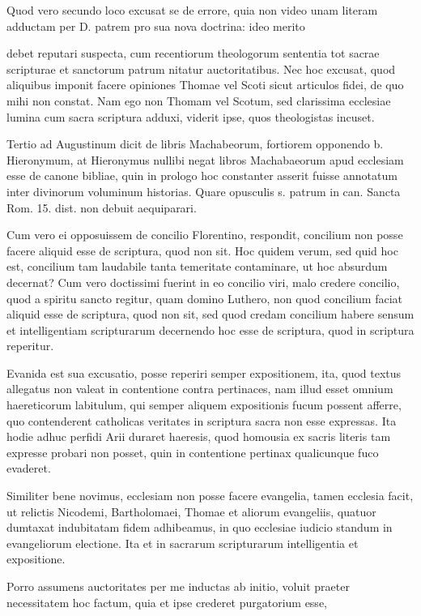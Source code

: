 Quod vero secundo loco excusat se de errore, quia non video unam literam adductam per D. patrem pro sua nova doctrina: ideo merito

debet reputari suspecta, cum recentiorum theologorum sententia tot sacrae scripturae et sanctorum patrum nitatur auctoritatibus. Nec hoc excusat, quod aliquibus imponit facere opiniones Thomae vel Scoti sicut articulos fidei, de quo mihi non constat. Nam ego non Thomam vel Scotum, sed clarissima ecclesiae lumina cum sacra scriptura adduxi, viderit ipse, quos theologistas incuset.

Tertio ad Augustinum dicit de libris Machabeorum, fortiorem opponendo b. Hieronymum, at Hieronymus nullibi negat libros Machabaeorum apud ecclesiam esse de canone bibliae, quin in prologo hoc constanter asserit fuisse annotatum inter divinorum voluminum historias. Quare opusculis s. patrum in can. Sancta Rom. 15. dist. non debuit aequiparari.

Cum vero ei opposuissem de concilio Florentino, respondit, concilium non posse \marginpar{\small[335]} facere aliquid esse de scriptura, quod non sit. Hoc quidem verum, sed quid hoc est, concilium tam laudabile tanta temeritate contaminare, ut hoc absurdum decernat? Cum vero doctissimi fuerint in eo concilio viri, malo credere concilio, quod a spiritu sancto regitur, quam domino Luthero, non quod concilium faciat aliquid esse de scriptura, quod non sit, sed quod credam concilium habere sensum et intelligentiam scripturarum decernendo hoc esse de scriptura, quod in scriptura reperitur.

Evanida est sua excusatio, posse reperiri semper expositionem, ita, quod textus allegatus non valeat in contentione contra pertinaces, nam illud esset omnium haereticorum labitulum, qui semper aliquem expositionis fucum possent afferre, quo contenderent catholicas veritates in scriptura sacra non esse expressas. Ita hodie adhuc perfidi Arii duraret haeresis, quod homousia ex sacris literis tam expresse probari non posset, quin in contentione pertinax qualicunque fuco evaderet.

Similiter bene novimus, ecclesiam non posse facere evangelia, tamen ecclesia facit, ut relictis Nicodemi, Bartholomaei, Thomae et aliorum evangeliis, quatuor dumtaxat indubitatam fidem adhibeamus, in quo ecclesiae iudicio standum in evangeliorum electione. Ita et in sacrarum scripturarum intelligentia et expositione.

Porro assumens auctoritates per me inductas ab initio, voluit praeter necessitatem hoc factum, quia et ipse crederet purgatorium esse,

